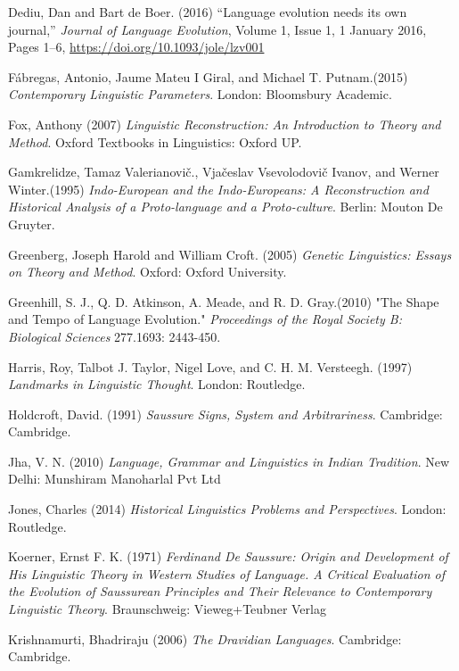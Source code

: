 \begin{thebibliography}{99}
  Dediu, Dan and Bart de Boer. (2016) “Language evolution needs its own journal,” \textit{Journal of Language Evolution}, Volume 1, Issue 1, 1 January 2016, Pages 1–6, \url{https://doi.org/10.1093/jole/lzv001}

  Fábregas, Antonio, Jaume Mateu I Giral, and Michael T. Putnam.(2015) \textit{Contemporary Linguistic Parameters}. London: Bloomsbury Academic.

  Fox, Anthony (2007) \textit{Linguistic Reconstruction: An Introduction to Theory and Method}. Oxford Textbooks in Linguistics: Oxford UP.

  Gamkrelidze, Tamaz Valerianovič., Vjačeslav Vsevolodovič Ivanov, and Werner Winter.(1995) \textit{Indo-European and the Indo-Europeans: A Reconstruction and Historical Analysis of a Proto-language and a Proto-culture}. Berlin: Mouton De Gruyter.

  Greenberg, Joseph Harold and William Croft. (2005) \textit{Genetic Linguistics: Essays on Theory and Method}. Oxford: Oxford University.

  Greenhill, S. J., Q. D. Atkinson, A. Meade, and R. D. Gray.(2010) "The Shape and Tempo of Language Evolution." \textit{Proceedings of the Royal Society B: Biological Sciences} 277.1693: 2443-450.

  Harris, Roy, Talbot J. Taylor, Nigel Love, and C. H. M. Versteegh. (1997) \textit{Landmarks in Linguistic Thought}. London: Routledge.

  Holdcroft, David. (1991) \textit{Saussure Signs, System and Arbitrariness}. Cambridge: Cambridge.

  Jha, V. N. (2010) \textit{Language, Grammar and Linguistics in Indian Tradition}. New Delhi: Munshiram Manoharlal Pvt Ltd

  Jones, Charles (2014)\textit{ Historical Linguistics Problems and Perspectives}. London: Routledge.

  Koerner, Ernst F. K. (1971) \textit{Ferdinand De Saussure: Origin and Development of His Linguistic Theory in Western Studies of Language. A Critical Evaluation of the Evolution of Saussurean Principles and Their Relevance to Contemporary Linguistic Theory}. Braunschweig: Vieweg+Teubner Verlag

  Krishnamurti, Bhadriraju (2006) \textit{The Dravidian Languages}. Cambridge: Cambridge.


\end{thebibliography}
